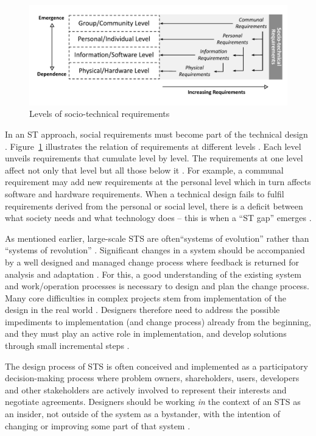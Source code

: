 %
%
\begin{figure}[b!]
\centering
\includegraphics[width=.82\linewidth]{img/sts_requirements.pdf}
\caption{Levels of socio-technical requirements \cite{Whitworth2009a}}
\label{fig:sts_requirements} 
\end{figure}
% 
%
In an ST approach, social requirements must become part of the technical design \cite{Whitworth2014}. Figure~\ref{fig:sts_requirements} illustrates the relation of requirements at different levels \cite{Whitworth2009a}. Each level unveils requirements that cumulate level by level. The requirements at one level affect not only that level but all those below it \cite{Whitworth2009a}. For example, a communal requirement may add new requirements at the personal level which in turn affects software and hardware requirements. When a technical design fails to fulfil requirements derived from the personal or social level, there is a deficit  between  what  society  needs  and  what technology does -- this is when a ``ST  gap''  emerges \cite{Whitworth2014}. 


As mentioned earlier, large-scale STS are often``systems of evolution'' rather than ``systems of revolution'' \cite{Baxter2011,Norman2015}. Significant changes in a system should be accompanied by a well designed and managed change process where feedback is returned for analysis and adaptation \cite{Baxter2011}. For this, a good understanding of the existing system and work/operation processes is necessary to design and plan the change process. Many core difficulties in complex projects stem from implementation of the design in the real world \cite{Norman2015}. Designers therefore need to address the possible impediments to implementation (and change process) already from the beginning, and they must play an active role in implementation, and develop solutions through small incremental steps \cite{Norman2015}.

 The design process of STS is often conceived and implemented as a participatory decision-making process where problem owners, shareholders, users, developers and other stakeholders are actively involved to represent their interests and negotiate agreements. 
Designers should be working \textit{in} the context of an STS as an insider, not outside of the system as a bystander, with the intention of changing or improving some part of that system \cite{Bots2007}. 

